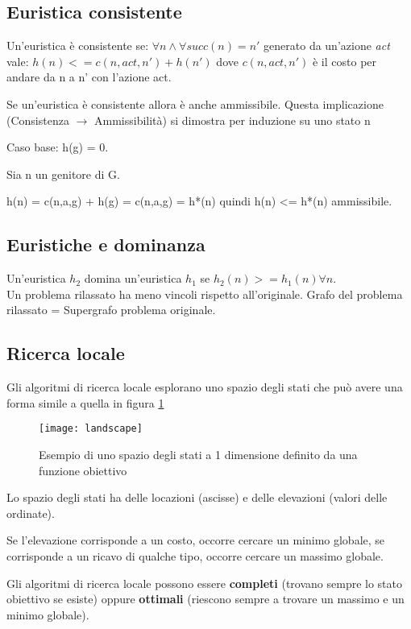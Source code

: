 \subsection{Euristica consistente}

Un'euristica è consistente se:
$\forall n \land \forall succ(n) = n'$ generato da un'azione 
\textit{act} vale: $h(n) <= c(n,act,n') + h(n')$
dove $c(n,act,n')$ è il costo per andare da n a n' con l'azione act.

Se un'euristica è consistente allora è anche ammissibile.
Questa implicazione (Consistenza $\rightarrow$ Ammissibilità) si dimostra per
induzione su uno stato n

Caso base:
h(g) = 0.

Sia n un genitore di G.

h(n) = c(n,a,g) + h(g) = c(n,a,g) = h*(n) quindi h(n) <= h*(n) ammissibile.

\subsection{Euristiche e dominanza}

Un'euristica $h_2$ domina un'euristica $h_1$ se $h_2(n) >= h_1(n) \forall n$.\\

Un problema rilassato ha meno vincoli rispetto all'originale.
Grafo del problema rilassato = Supergrafo problema originale.

\subsection{Ricerca locale}

Gli algoritmi di ricerca locale esplorano uno spazio degli stati che può avere
una forma simile a quella in figura \ref{fig:landscape}

\begin{figure}[H]
\centering
\texttt{[image: landscape]}
\caption{Esempio di uno spazio degli stati a 1 dimensione definito da una
funzione obiettivo}
\label{fig:landscape}
\end{figure}

Lo spazio degli stati ha delle locazioni (ascisse) e delle elevazioni
(valori delle ordinate).

Se l'elevazione corrisponde a un costo, occorre cercare un minimo globale,
se corrisponde a un ricavo di qualche tipo, occorre cercare un massimo globale.

Gli algoritmi di ricerca locale possono essere \textbf{completi} (trovano
sempre lo stato obiettivo se esiste) oppure \textbf{ottimali} (riescono sempre a
trovare un massimo e un minimo globale).

